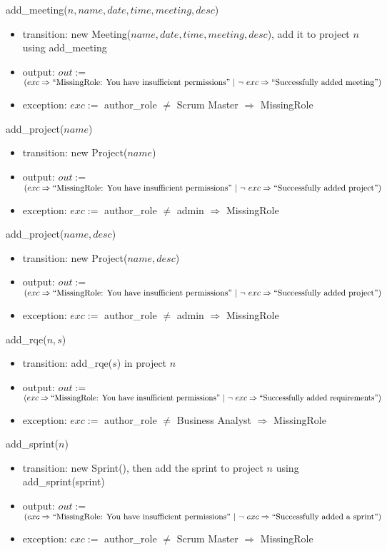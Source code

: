 \documentclass[12pt, titlepage]{article}
\begin{document}
\noindent add\_meeting($n, name, date, time, meeting, desc$)
\begin{itemize}
    \item transition: new Meeting($name, date, time, meeting, desc$), add it to project $n$ using add\_meeting
    \item output: $out :=$ $(exc \Rightarrow ``\text{MissingRole: You have insufficient permissions}"\ |\ \lnot\ exc \Rightarrow ``\text{Successfully added meeting}")$
    \item exception: $exc :=$ author\_role $\neq$ Scrum Master $\Rightarrow$ MissingRole
\end{itemize}

\noindent add\_project($name$)
\begin{itemize}
    \item transition: new Project($name$)
    \item output: $out :=$ $(exc \Rightarrow ``\text{MissingRole: You have insufficient permissions}"\ |\ \lnot\ exc \Rightarrow ``\text{Successfully added project}")$
    \item exception: $exc :=$ author\_role $\neq$ admin $\Rightarrow$ MissingRole
\end{itemize}

\noindent add\_project($name, desc$)
\begin{itemize}
    \item transition: new Project($name, desc$)
    \item output: $out :=$ $(exc \Rightarrow ``\text{MissingRole: You have insufficient permissions}"\ |\ \lnot\ exc \Rightarrow ``\text{Successfully added project}")$
    \item exception: $exc :=$ author\_role $\neq$ admin $\Rightarrow$ MissingRole
\end{itemize}

\noindent add\_rqe($n, s$)
\begin{itemize}
    \item transition: add\_rqe($s$) in project $n$
    \item output: $out :=$ $(exc \Rightarrow ``\text{MissingRole: You have insufficient permissions}"\ |\ \lnot\ exc \Rightarrow ``\text{Successfully added requirements}")$
    \item exception: $exc :=$ author\_role $\neq$ Business Analyst $\Rightarrow$ MissingRole
\end{itemize}

\noindent add\_sprint($n$)
\begin{itemize}
    \item transition: new Sprint(), then add the sprint to project $n$ using add\_sprint(sprint)
    \item output: $out :=$ $(exc \Rightarrow ``\text{MissingRole: You have insufficient permissions}"\ |\ \lnot\ exc \Rightarrow ``\text{Successfully added a sprint}")$
    \item exception: $exc :=$ author\_role $\neq$ Scrum Master $\Rightarrow$ MissingRole
\end{itemize}
\end{document}
